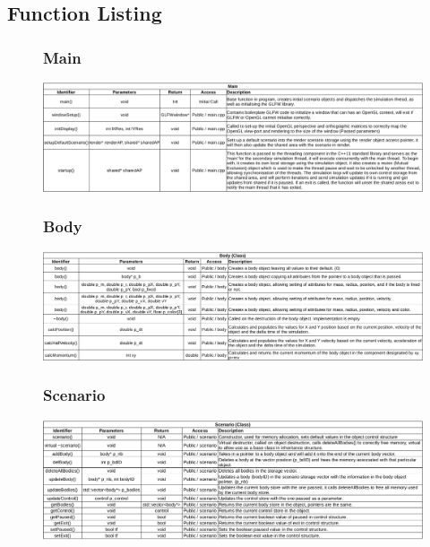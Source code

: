 \subsection{Function Listing}

\begin{figure}
  \subsubsection{Main}
  \centering  
  \includegraphics[width=\textwidth]{img/functions/main.png}
\end{figure}

\begin{figure}
  \subsubsection{Body}
  \centering  
  \includegraphics[width=\textwidth]{img/functions/body.png}
\end{figure}

\begin{figure}
  \subsubsection{Scenario}
  \centering  
  \includegraphics[width=\textwidth]{img/functions/scenario.png}
\end{figure}

